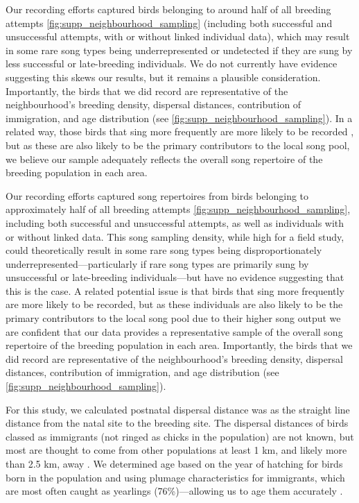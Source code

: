 \documentclass[9pt, onecolumn, twoside, lineno]{gsajnl}
\begin{document}
Our recording efforts captured birds belonging to around half of all breeding attempts \autoref{fig:supp_neighbourhood_sampling} (including both successful and unsuccessful attempts, with or without linked individual data), which may result in some rare song types being underrepresented or undetected if they are sung by less successful or late-breeding individuals. We do not currently have evidence suggesting this skews our results, but it remains a plausible consideration. Importantly, the birds that we did record are representative of the neighbourhood's breeding density, dispersal distances, contribution of immigration, and age distribution (see  \autoref{fig:supp_neighbourhood_sampling}). In a related way, those birds that sing more frequently are more likely to be recorded , but as these are also likely to be the primary contributors to the local song pool, we believe our sample adequately reflects the overall song repertoire of the breeding population in each area.

Our recording efforts captured song repertoires from birds belonging to approximately half of all breeding attempts \autoref{fig:supp_neighbourhood_sampling}, including both successful and unsuccessful attempts, as well as individuals with or without linked data. This song sampling density, while high for a field study, could theoretically result in some rare song types being disproportionately underrepresented—particularly if rare song types are primarily sung by unsuccessful or late-breeding individuals—but have no evidence suggesting that this is the case. A related potential issue is that birds that sing more frequently are more likely to be recorded, but as these individuals are also likely to be the primary contributors to the local song pool due to their higher song output we are confident that our data provides a representative sample of the overall song repertoire of the breeding population in each area. Importantly, the birds that we did record are representative of the neighbourhood's breeding density, dispersal distances, contribution of immigration, and age distribution (see  \autoref{fig:supp_neighbourhood_sampling}).
 
For this study, we calculated postnatal dispersal distance was as the straight line distance from the natal site to the breeding site. The dispersal distances of birds classed as immigrants (not ringed as chicks in the population) are not known, but most are thought to come from other populations at least 1 km, and likely more than 2.5 km, away \autocite{verhulst1997, quinn2011}. We determined age based on the year of hatching for birds born in the population and using plumage characteristics for immigrants, which are most often caught as yearlings (76\%)---allowing us to age them accurately \autocite{woodman2023}.
\end{document}
